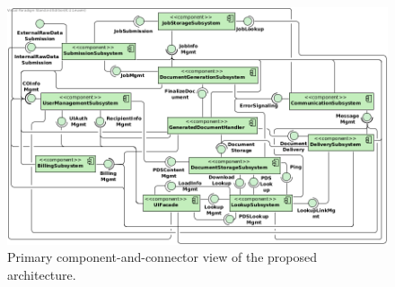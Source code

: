 \begin{figure}[!htp]
    \centering
    \includegraphics[width=\textwidth]{figures/Subsystem Diagram.png}
    \caption{Primary component-and-connector view of the proposed architecture.}\label{fig:cs-primary}
\end{figure}


